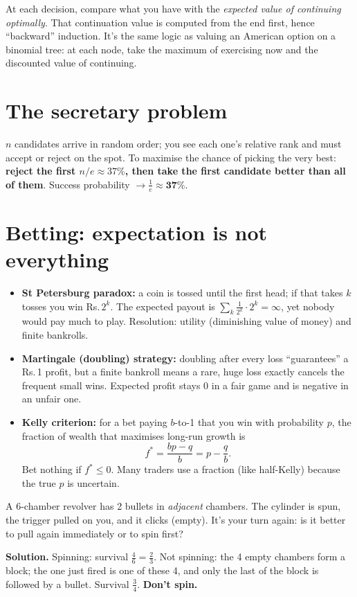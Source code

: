 \documentclass[11pt,a4paper,openany]{report}
\newcommand{\Rs}{Rs.\,}
\begin{document}
\begin{why}
At each decision, compare what you have with the \emph{expected value of continuing optimally}. That continuation value is computed from the end first, hence ``backward'' induction. It's the same logic as valuing an American option on a binomial tree: at each node, take the maximum of exercising now and the discounted value of continuing.
\end{why}

\section{The secretary problem}
$n$ candidates arrive in random order; you see each one's relative rank and must accept or reject on the spot. To maximise the chance of picking the very best: \textbf{reject the first $n/e\approx37\%$, then take the first candidate better than all of them}. Success probability $\to\frac1e\approx\mathbf{37\%}$.

\section{Betting: expectation is not everything}
\begin{itemize}
\item \textbf{St Petersburg paradox:} a coin is tossed until the first head; if that takes $k$ tosses you win \Rs$2^k$. The expected payout is $\sum_k\frac1{2^k}\cdot2^k=\infty$, yet nobody would pay much to play. Resolution: utility (diminishing value of money) and finite bankrolls.
\item \textbf{Martingale (doubling) strategy:} doubling after every loss ``guarantees'' a \Rs1 profit, but a finite bankroll means a rare, huge loss exactly cancels the frequent small wins. Expected profit stays 0 in a fair game and is negative in an unfair one.
\item \textbf{Kelly criterion:} for a bet paying $b$-to-1 that you win with probability $p$, the fraction of wealth that maximises long-run growth is
\[f^*=\frac{bp-q}{b}=p-\frac qb.\]
Bet nothing if $f^*\le0$. Many traders use a fraction (like half-Kelly) because the true $p$ is uncertain.
\end{itemize}

\begin{example}
A 6-chamber revolver has 2 bullets in \emph{adjacent} chambers. The cylinder is spun, the trigger pulled on you, and it clicks (empty). It's your turn again: is it better to pull again immediately or to spin first?

\textbf{Solution.} Spinning: survival $\frac46=\frac23$. Not spinning: the 4 empty chambers form a block; the one just fired is one of these 4, and only the last of the block is followed by a bullet. Survival $\frac34$. \textbf{Don't spin.}
\end{example}
\end{document}
